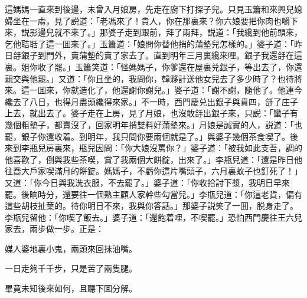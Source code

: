 這媽媽一直來到後邊，未曾入月娘房，先走在廚下打探子兒。只見玉簫和來興兒媳婦坐在一䖏，見了説道：「老馮來了！貴人，你在那裏來？你六娘要把你肉也嚼下來，説影邊兒就不來了。」那婆子走到跟前，拜了兩拜，説道：「我纔到他前頭來，乞他聐聒了這一囬來了。」玉簫道：「娘問你替他捎的蒲墊兒怎樣的。」婆子道：「昨日㧱銀子到門外，賣蒲墊的賣了家去了。直到明年三月裏纔來哩。銀子我還㧱在這裏。姐你收了罷。」玉簫笑道：「怪媽媽子，你爹還在屋裏兑銀子，等出去了，你還親交與他罷。」又道：「你且坐的，我問你，韓夥計送他女兒去了多少時了？也待將來。這一囬來，你就造化了，他還謝你謝兒。」婆子道：「謝不謝，隨他了。他連今纔去了八日，也得月盡頭纔得來家。」不一時，西門慶兑出銀子與賁四，㧱了庄子上去，就出去了。婆子走在上房，見了月娘，也沒敢㧱出銀子來，只説：「蠻子有幾個粗墊子，都賣沒了，回家明年捎雙料好蒲墊來。」月娘是誠實的人，説道：「也罷，銀子你還收着。到明年，我只問你要兩個就是了。」與婆子幾個茶食喫了。後來到李瓶兒房裏來，瓶兒因問：「你大娘沒罵你？」婆子道：「被我如此支吾，調的他喜歡了，倒與我些茶喫，賞了我兩個大餅錠，出來了。」李瓶兒道：「還是昨日他往喬大戶家喫滿月的餅錠。媽媽子，不虧你這片嘴頭子，六月裏蚊子也釘死了！」又道：「你今日與我洗衣服，不去罷了。」婆子道：「你收拾討下漿，我明日早來罷。後晌時分，還要往一個熟主顧人家幹些勾當兒。」李瓶兒道：「你這老貨，偏有這些胡枝扯葉的。待你明日不來，我與你答話。」那婆子説笑了一囬，脱身走了。李瓶兒留他：「你喫了飯去。」婆子道：「還飽着哩，不喫罷。」恐怕西門慶往王六兒家去，兩步做一步。正是：

\begin{myquote}
媒人婆地裏小鬼，兩頭來回抹油嘴。

一日走夠千千步，只是苦了兩隻腿。
\end{myquote}

畢竟未知後來如何，且聽下囬分解。

